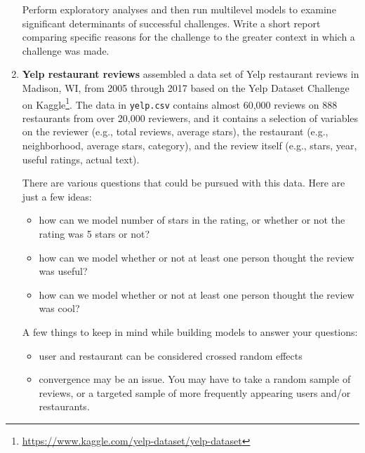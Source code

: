 \documentclass[
]{krantz}
\providecommand{\tightlist}{%
  \setlength{\itemsep}{0pt}\setlength{\parskip}{0pt}}
\renewcommand{\href}[2]{#2\footnote{\url{#1}}}
\begin{document}
\begin{enumerate}
  Perform exploratory analyses and then run multilevel models to examine significant determinants of successful challenges. Write a short report comparing specific reasons for the challenge to the greater context in which a challenge was made.
\item
  \textbf{Yelp restaurant reviews} \citet{Mohr2018} assembled a data set of Yelp restaurant reviews in Madison, WI, from 2005 through 2017 based on the Yelp Dataset Challenge on \href{https://www.kaggle.com/yelp-dataset/yelp-dataset}{Kaggle}. The data in \texttt{yelp.csv} contains almost 60,000 reviews on 888 restaurants from over 20,000 reviewers, and it contains a selection of variables on the reviewer (e.g., total reviews, average stars), the restaurant (e.g., neighborhood, average stars, category), and the review itself (e.g., stars, year, useful ratings, actual text).

  There are various questions that could be pursued with this data. Here are just a few ideas:

  \begin{itemize}
  \tightlist
  \item
    how can we model number of stars in the rating, or whether or not the rating was 5 stars or not?
  \item
    how can we model whether or not at least one person thought the review was useful?
  \item
    how can we model whether or not at least one person thought the review was cool?
  \end{itemize}

  A few things to keep in mind while building models to answer your questions:

  \begin{itemize}
  \tightlist
  \item
    user and restaurant can be considered crossed random effects
  \item
    convergence may be an issue. You may have to take a random sample of reviews, or a targeted sample of more frequently appearing users and/or restaurants.
  \end{itemize}
\end{enumerate}

  

\backmatter
\printindex
\end{document}
